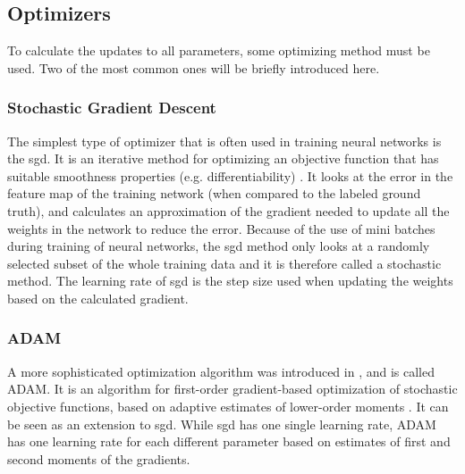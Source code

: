 \subsection{Optimizers}
To calculate the updates to all parameters, some optimizing method must be used. Two of the most common ones will be briefly introduced here.

\subsubsection{Stochastic Gradient Descent}
The simplest type of optimizer that is often used in training neural networks is the \gls{sgd}. It is an iterative method for optimizing an objective function that has suitable smoothness properties (e.g. differentiability) \cite{stochasticgradientdescent}. It looks at the error in the feature map of the training network (when compared to the labeled ground truth), and calculates an approximation of the gradient needed to update all the weights in the network to reduce the error. Because of the use of mini batches during training of neural networks, the \gls{sgd} method only looks at a randomly selected subset of the whole training data and it is therefore called a stochastic method. The learning rate of \gls{sgd} is the step size used when updating the weights based on the calculated gradient.

\subsubsection{ADAM}
A more sophisticated optimization algorithm was introduced in \citeyear{kingma2015adam}, and is called ADAM. It is an algorithm for first-order gradient-based optimization of stochastic objective functions, based on adaptive estimates of lower-order moments \cite{kingma2015adam}. It can be seen as an extension to \gls{sgd}. While \gls{sgd} has one single learning rate, ADAM has one learning rate for each different parameter based on estimates of first and second moments of the gradients. 